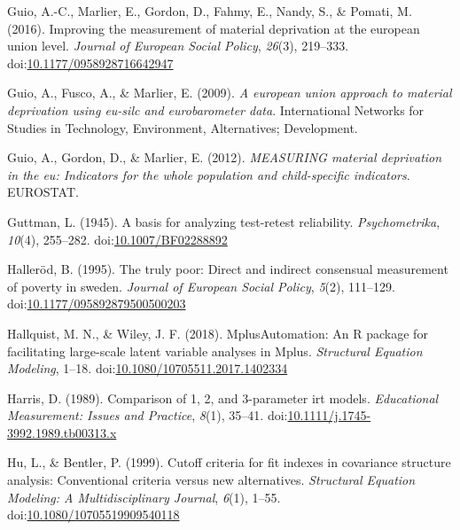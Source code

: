\documentclass[]{book}
\begin{document}
\leavevmode\hypertarget{ref-Guio2016}{}%
Guio, A.-C., Marlier, E., Gordon, D., Fahmy, E., Nandy, S., \& Pomati, M. (2016). Improving the measurement of material deprivation at the european union level. \emph{Journal of European Social Policy}, \emph{26}(3), 219--333. doi:\href{https://doi.org/10.1177/0958928716642947}{10.1177/0958928716642947}

\leavevmode\hypertarget{ref-Guio2009}{}%
Guio, A., Fusco, A., \& Marlier, E. (2009). \emph{A european union approach to material deprivation using eu-silc and eurobarometer data}. International Networks for Studies in Technology, Environment, Alternatives; Development.

\leavevmode\hypertarget{ref-Guio2012}{}%
Guio, A., Gordon, D., \& Marlier, E. (2012). \emph{MEASURING material deprivation in the eu: Indicators for the whole population and child-specific indicators}. EUROSTAT.

\leavevmode\hypertarget{ref-Guttman1945}{}%
Guttman, L. (1945). A basis for analyzing test-retest reliability. \emph{Psychometrika}, \emph{10}(4), 255--282. doi:\href{https://doi.org/10.1007/BF02288892}{10.1007/BF02288892}

\leavevmode\hypertarget{ref-Hallerod1995}{}%
Halleröd, B. (1995). The truly poor: Direct and indirect consensual measurement of poverty in sweden. \emph{Journal of European Social Policy}, \emph{5}(2), 111--129. doi:\href{https://doi.org/10.1177/095892879500500203}{10.1177/095892879500500203}

\leavevmode\hypertarget{ref-Hallquist2018}{}%
Hallquist, M. N., \& Wiley, J. F. (2018). MplusAutomation: An R package for facilitating large-scale latent variable analyses in Mplus. \emph{Structural Equation Modeling}, 1--18. doi:\href{https://doi.org/10.1080/10705511.2017.1402334}{10.1080/10705511.2017.1402334}

\leavevmode\hypertarget{ref-Harris1989}{}%
Harris, D. (1989). Comparison of 1, 2, and 3-parameter irt models. \emph{Educational Measurement: Issues and Practice}, \emph{8}(1), 35--41. doi:\href{https://doi.org/10.1111/j.1745-3992.1989.tb00313.x}{10.1111/j.1745-3992.1989.tb00313.x}

\leavevmode\hypertarget{ref-Hu1999}{}%
Hu, L., \& Bentler, P. (1999). Cutoff criteria for fit indexes in covariance structure analysis: Conventional criteria versus new alternatives. \emph{Structural Equation Modeling: A Multidisciplinary Journal}, \emph{6}(1), 1--55. doi:\href{https://doi.org/10.1080/10705519909540118}{10.1080/10705519909540118}
\end{document}
